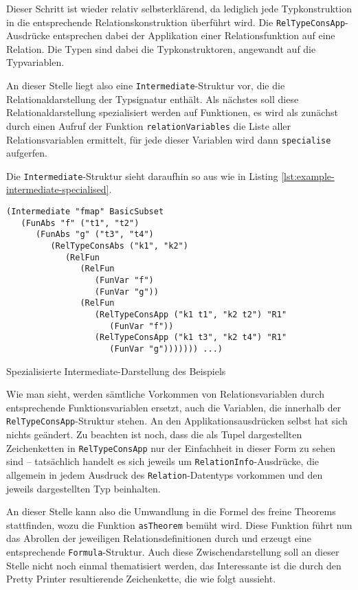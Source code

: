 Dieser Schritt ist wieder relativ selbsterklärend, da lediglich jede Typkonstruktion in die entsprechende Relationskonstruktion
überführt wird. Die \texttt{RelTypeConsApp}-Ausdrücke entsprechen dabei der Applikation einer Relationsfunktion auf
eine Relation. Die Typen sind dabei die Typkonstruktoren, angewandt auf die Typvariablen.

An dieser Stelle liegt also eine \texttt{Intermediate}-Struktur vor, die die Relationaldarstellung der Typsignatur enthält. Als
nächstes soll diese Relationaldarstellung spezialisiert werden auf Funktionen, es wird als zunächst durch einen Aufruf der Funktion
\texttt{relationVariables} die Liste aller Relationsvariablen ermittelt, für jede dieser Variablen wird dann \texttt{specialise}
aufgerfen.

Die \texttt{Intermediate}-Struktur sieht daraufhin so aus wie in Listing \ref{lst:example-intermediate-specialised}.

\begin{listing}[ht]
\begin{verbatim}
(Intermediate "fmap" BasicSubset
   (FunAbs "f" ("t1", "t2")
      (FunAbs "g" ("t3", "t4")
         (RelTypeConsAbs ("k1", "k2")
            (RelFun
               (RelFun
                  (FunVar "f")
                  (FunVar "g"))
               (RelFun
                  (RelTypeConsApp ("k1 t1", "k2 t2") "R1"
                     (FunVar "f"))
                  (RelTypeConsApp ("k1 t3", "k2 t4") "R1"
                     (FunVar "g"))))))) ...)
\end{verbatim}
\caption{Spezialisierte Intermediate-Darstellung des Beispiels}
\label{lst:example-intermediate-specialised}
\end{listing}

Wie man sieht, werden sämtliche Vorkommen von Relationsvariablen durch entsprechende Funktionsvariablen ersetzt, auch
die Variablen, die innerhalb der \texttt{RelTypeConsApp}-Struktur stehen. An den Applikationsausdrücken selbst hat sich
nichts geändert. Zu beachten ist noch, dass die als Tupel dargestellten Zeichenketten in \texttt{RelTypeConsApp} nur
der Einfachheit in dieser Form zu sehen sind -- tatsächlich handelt es sich jeweils um \texttt{RelationInfo}-Ausdrücke, die
allgemein in jedem Ausdruck des \texttt{Relation}-Datentyps vorkommen und den jeweils dargestellten Typ beinhalten.

An dieser Stelle kann also die Umwandlung in die Formel des freine Theorems stattfinden, wozu die Funktion \texttt{asTheorem}
bemüht wird. Diese Funktion führt nun das Abrollen der jeweiligen Relationsdefinitionen durch und erzeugt eine
entsprechende \texttt{Formula}-Struktur. Auch diese Zwischendarstellung soll an dieser Stelle nicht noch einmal thematisiert
werden, das Interessante ist die durch den Pretty Printer resultierende Zeichenkette, die wie folgt aussieht.

